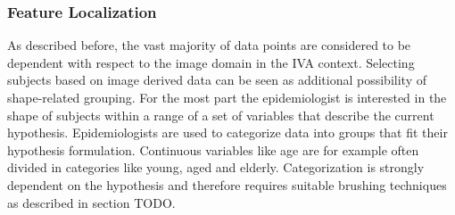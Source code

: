 \documentclass[journal]{style/vgtc}           %
\begin{document}


\subsubsection{Feature Localization}
As described before, the vast majority of data points are considered to be dependent with respect to the image domain in the IVA context.
%
Selecting subjects based on image derived data can be seen as additional possibility of shape-related grouping.
%
For the most part the epidemiologist is interested in the shape of subjects within a range of a set of variables that describe the current hypothesis.
%
Epidemiologists are used to categorize data into groups that fit their hypothesis formulation.
%
Continuous variables like age are for example often divided in categories like young, aged and elderly.
%
Categorization is strongly dependent on the hypothesis and therefore requires suitable brushing techniques as described in section TODO.
%

\end{document}
